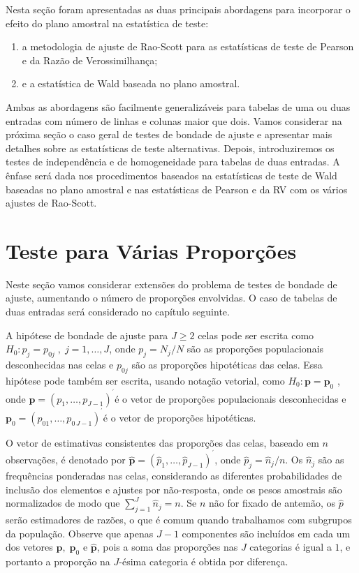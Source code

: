 \documentclass[]{book}
\numberwithin{example}{chapter}
\numberwithin{remark}{chapter}
\numberwithin{definition}{chapter}
\begin{document}
Nesta seção foram apresentadas as duas principais abordagens para
incorporar o efeito do plano amostral na estatística de teste:

\begin{enumerate}
\def\labelenumi{\arabic{enumi}.}
\item
  a metodologia de ajuste de Rao-Scott para as estatísticas de teste de
  Pearson e da Razão de Verossimilhança;
\item
  e a estatística de Wald baseada no plano amostral.
\end{enumerate}

Ambas as abordagens são facilmente generalizáveis para tabelas de uma ou
duas entradas com número de linhas e colunas maior que dois. Vamos
considerar na próxima seção o caso geral de testes de bondade de ajuste
e apresentar mais detalhes sobre as estatísticas de teste alternativas.
Depois, introduziremos os testes de independência e de homogeneidade
para tabelas de duas entradas. A ênfase será dada nos procedimentos
baseados na estatísticas de teste de Wald baseadas no plano amostral e
nas estatísticas de Pearson e da RV com os vários ajustes de Rao-Scott.

\section{Teste para Várias
Proporções}\label{teste-para-varias-proporcoes}

Neste seção vamos considerar extensões do problema de testes de bondade
de ajuste, aumentando o número de proporções envolvidas. O caso de
tabelas de duas entradas será considerado no capítulo seguinte.

A hipótese de bondade de ajuste para \(J\geq 2\) celas pode ser escrita
como \(H_{0}:p_{j}=p_{0j}\;,\;j=1,\ldots ,J\), onde \(p_{j}=N_{j}/N\)
são as proporções populacionais desconhecidas nas celas e \(p_{0j}\) são
as proporções hipotéticas das celas. Essa hipótese pode também ser
escrita, usando notação vetorial, como \(H_{0}:\mathbf{p=p}_{0}\) , onde
\(\mathbf{p=}\left( p_{1},\ldots ,p_{J-1}\right) ^{^{\prime}}\)é o vetor
de proporções populacionais desconhecidas e
\(\mathbf{p}_{0}\mathbf{=}\left( p_{01},\ldots ,p_{0\,J-1}\right) ^{^{\prime}}\)é
o vetor de proporções hipotéticas.

O vetor de estimativas consistentes das proporções das celas, baseado em
\(n\) observações, é denotado por
\(\widehat{\mathbf{p}}\mathbf{=}\left(\widehat{p}_{1},\ldots,\widehat{p}_{J-1}\right) ^{^{\prime}}\),
onde \(\widehat{p}_{j}=\widehat{n}_{j}/n\). Os \(\widehat{n}_{j}\) são
as frequências ponderadas nas celas, considerando as diferentes
probabilidades de inclusão dos elementos e ajustes por não-resposta,
onde os pesos amostrais são normalizados de modo que
\(\sum_{j=1}^{J}\widehat{n}_{j}=n\). Se \(n\) não for fixado de antemão,
os \(\widehat{p}\) serão estimadores de razões, o que é comum quando
trabalhamos com subgrupos da população. Observe que apenas \(J-1\)
componentes são incluídos em cada um dos vetores \(\mathbf{p,\;p}_{0}\)
e \(\widehat{\mathbf{p}}\), pois a soma das proporções nas \(J\)
categorias é igual a \(1\), e portanto a proporção na \(J\)-ésima
categoria é obtida por diferença.
\end{document}

